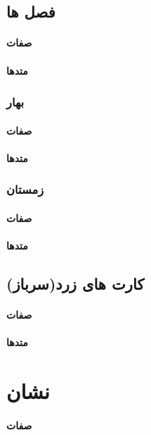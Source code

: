 \documentclass[pdf,titlepage,a4paper]{report}
\begin{document}
	
	\subsection{فصل ها}
	\paragraph{صفات}
	\paragraph{متدها}
	
	\subsubsection{بهار}
	\paragraph{صفات}
	\paragraph{متدها}
	
	\subsubsection{زمستان}
	\paragraph{صفات}
	\paragraph{متدها}
	
	
	\subsection{کارت های زرد(سرباز)}
	\paragraph{صفات}
	\paragraph{متدها}
	\newpage
	
	\section{نشان}
	\paragraph{صفات}
\end{document}
